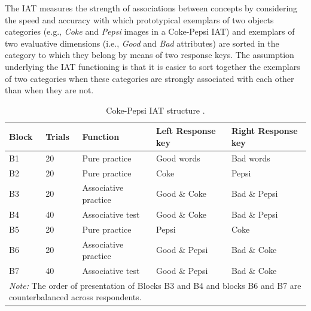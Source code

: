 \documentclass[12pt]{book}
\begin{document}
The IAT measures the strength of associations between concepts by considering the speed and accuracy with which prototypical exemplars of two objects  categories (e.g., \emph{Coke} and \emph{Pepsi} images in a Coke-Pepsi IAT) and exemplars of two evaluative dimensions (i.e., \emph{Good} and \emph{Bad} attributes) are sorted in the category to which they belong by means of two response keys. 
The assumption underlying the IAT functioning is that it is easier to sort together the exemplars of two categories when these categories are strongly associated with each other than when they are not.

\begin{table}[h!]
	\centering \doublespacing
	\caption{Coke-Pepsi IAT structure \protect\cite<Adapted from >{Greenwald2003}.}
	\label{tab:iatstructure}
	\begin{tabular}{p{1cm} p{1.2cm} p{4cm} p{4cm} p{4cm}}
		\toprule
		Block & Trials & Function  & Left Response key & Right Response key \\
		\midrule
		B1 & 20 & Pure practice & Good words & Bad words \\
		B2 & 20 & Pure practice & Coke & Pepsi \\
		B3 & 20 & Associative practice & Good \& Coke & Bad \& Pepsi \\
		B4 & 40 & Associative test & Good \& Coke & Bad \& Pepsi \\
		B5 & 20 & Pure practice & Pepsi & Coke \\
		B6 & 20 & Associative practice & Good \& Pepsi & Bad \& Coke \\
		B7 & 40 & Associative test & Good \& Pepsi & Bad \& Coke \\
		\bottomrule
		  \multicolumn{5}{p{13cm}}{\onehalfspacing\emph{Note:} The order of presentation of Blocks B3 and B4 and blocks B6 and B7 are counterbalanced across respondents.}
	\end{tabular}
\end{table}
\end{document}
